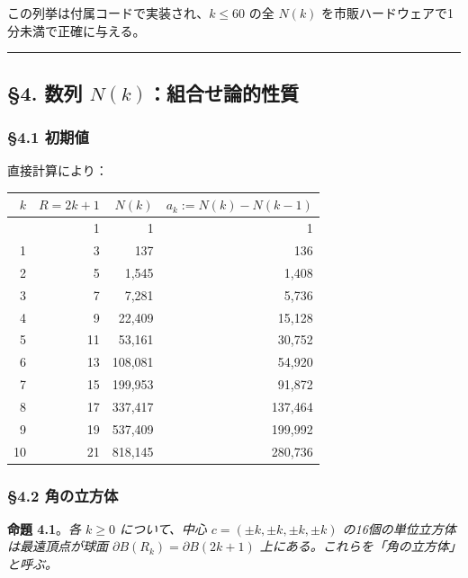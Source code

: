 \documentclass[a4paper,11pt]{ltjsarticle}
\theoremstyle{definition}
\begin{document}
この列挙は付属コードで実装され、\(k \le 60\) の全 \(N(k)\)
を市販ハードウェアで1分未満で正確に与える。

\begin{center}\rule{0.5\linewidth}{0.5pt}\end{center}

\subsection{\texorpdfstring{§4. 数列
\(N(k)\)：組合せ論的性質}{§4. 数列 N(k)：組合せ論的性質}}\label{ux6570ux5217-nkux7d44ux5408ux305bux8ad6ux7684ux6027ux8cea}

\subsubsection{§4.1 初期値}\label{ux521dux671fux5024}

直接計算により：

{\def\LTcaptype{none} %
\begin{longtable}[]{@{}rrrr@{}}
\toprule\noalign{}
\(k\) & \(R = 2k+1\) & \(N(k)\) & \(a_k := N(k) - N(k-1)\) \\
\midrule\noalign{}
\endhead
\bottomrule\noalign{}
\endlastfoot
0 & 1 & 1 & 1 \\
1 & 3 & 137 & 136 \\
2 & 5 & 1,545 & 1,408 \\
3 & 7 & 7,281 & 5,736 \\
4 & 9 & 22,409 & 15,128 \\
5 & 11 & 53,161 & 30,752 \\
6 & 13 & 108,081 & 54,920 \\
7 & 15 & 199,953 & 91,872 \\
8 & 17 & 337,417 & 137,464 \\
9 & 19 & 537,409 & 199,992 \\
10 & 21 & 818,145 & 280,736 \\
\end{longtable}
}

\subsubsection{§4.2 角の立方体}\label{ux89d2ux306eux7acbux65b9ux4f53}

\textbf{命題 4.1}。\emph{各 \(k \ge 0\) について、中心
\(c = (\pm k, \pm k, \pm k, \pm k)\) の16個の単位立方体は最遠頂点が球面
\(\partial B(R_k) = \partial B(2k+1)\)
上にある。これらを「角の立方体」と呼ぶ。}
\end{document}
